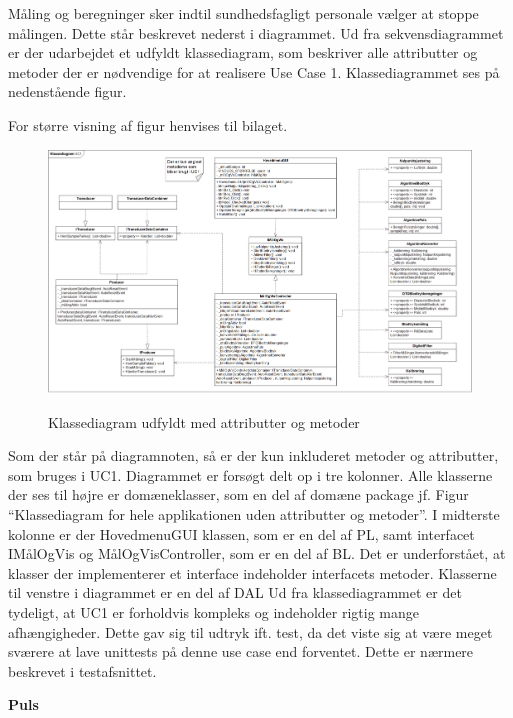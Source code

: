 Måling og beregninger sker indtil sundhedsfagligt personale vælger at stoppe målingen. Dette står beskrevet nederst i diagrammet. Ud fra sekvensdiagrammet er der udarbejdet et udfyldt klassediagram, som beskriver alle attributter og metoder der er nødvendige for at realisere Use Case 1. Klassediagrammet ses på nedenstående figur. 

For større visning af figur henvises til bilaget.

\clearpage

\begin{figure}[h!]
	\centering
	\includegraphics[width=1\linewidth]{Arkitektur_og_design/Softwarearkitektur/classdiagram}
	\label{fig:classdiagram}
	\caption{Klassediagram udfyldt med attributter og metoder}
\end{figure}
\vspace{0.5 cm}

Som der står på diagramnoten, så er der kun inkluderet metoder og attributter, som bruges i UC1. Diagrammet er forsøgt delt op i tre kolonner. Alle klasserne der ses til højre er domæneklasser, som en del af domæne package jf. Figur “Klassediagram for hele applikationen uden attributter og metoder”. I midterste kolonne er der HovedmenuGUI klassen, som er en del af PL, samt interfacet IMålOgVis og MålOgVisController, som er en del af BL. Det er underforstået, at klasser der implementerer et interface indeholder interfacets metoder. Klasserne til venstre i diagrammet er en del af DAL Ud fra klassediagrammet er det tydeligt, at UC1 er forholdvis kompleks og indeholder rigtig mange afhængigheder. Dette gav sig til udtryk ift. test, da det viste sig at være meget sværere at lave unittests på denne use case end forventet. Dette er nærmere beskrevet i testafsnittet.

\vspace{1 cm}
\textbf{Puls}

